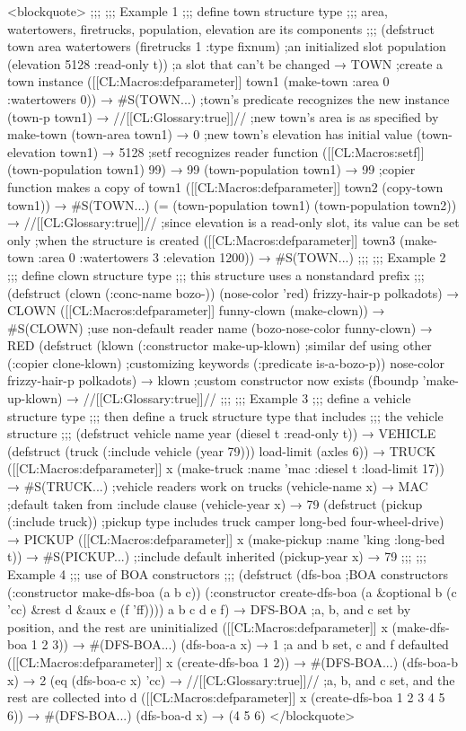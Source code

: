<blockquote> ;;; ;;; Example 1 ;;; define town structure type ;;; area, watertowers, firetrucks, population, elevation are its components ;;; (defstruct town area watertowers (firetrucks 1 :type fixnum) ;an initialized slot population (elevation 5128 :read-only t)) ;a slot that can't be changed → TOWN ;create a town instance ([[CL:Macros:defparameter]] town1 (make-town :area 0 :watertowers 0)) → #S(TOWN...) ;town's predicate recognizes the new instance (town-p town1) → //[[CL:Glossary:true]]// ;new town's area is as specified by make-town (town-area town1) → 0 ;new town's elevation has initial value (town-elevation town1) → 5128 ;setf recognizes reader function ([[CL:Macros:setf]] (town-population town1) 99) → 99 (town-population town1) → 99 ;copier function makes a copy of town1 ([[CL:Macros:defparameter]] town2 (copy-town town1)) → #S(TOWN...) (= (town-population town1) (town-population town2)) → //[[CL:Glossary:true]]// ;since elevation is a read-only slot, its value can be set only ;when the structure is created ([[CL:Macros:defparameter]] town3 (make-town :area 0 :watertowers 3 :elevation 1200)) → #S(TOWN...) ;;; ;;; Example 2 ;;; define clown structure type ;;; this structure uses a nonstandard prefix ;;; (defstruct (clown (:conc-name bozo-)) (nose-color 'red) frizzy-hair-p polkadots) → CLOWN ([[CL:Macros:defparameter]] funny-clown (make-clown)) → #S(CLOWN) ;use non-default reader name (bozo-nose-color funny-clown) → RED (defstruct (klown (:constructor make-up-klown) ;similar def using other (:copier clone-klown) ;customizing keywords (:predicate is-a-bozo-p)) nose-color frizzy-hair-p polkadots) → klown ;custom constructor now exists (fboundp 'make-up-klown) → //[[CL:Glossary:true]]// ;;; ;;; Example 3 ;;; define a vehicle structure type ;;; then define a truck structure type that includes ;;; the vehicle structure ;;; (defstruct vehicle name year (diesel t :read-only t)) → VEHICLE (defstruct (truck (:include vehicle (year 79))) load-limit (axles 6)) → TRUCK ([[CL:Macros:defparameter]] x (make-truck :name 'mac :diesel t :load-limit 17)) → #S(TRUCK...) ;vehicle readers work on trucks (vehicle-name x) → MAC ;default taken from :include clause (vehicle-year x) → 79 (defstruct (pickup (:include truck)) ;pickup type includes truck camper long-bed four-wheel-drive) → PICKUP ([[CL:Macros:defparameter]] x (make-pickup :name 'king :long-bed t)) → #S(PICKUP...) ;:include default inherited (pickup-year x) → 79 ;;; ;;; Example 4 ;;; use of BOA constructors ;;; (defstruct (dfs-boa ;BOA constructors (:constructor make-dfs-boa (a b c)) (:constructor create-dfs-boa (a &optional b (c 'cc) &rest d &aux e (f 'ff)))) a b c d e f) → DFS-BOA ;a, b, and c set by position, and the rest are uninitialized ([[CL:Macros:defparameter]] x (make-dfs-boa 1 2 3)) → #(DFS-BOA...) (dfs-boa-a x) → 1 ;a and b set, c and f defaulted ([[CL:Macros:defparameter]] x (create-dfs-boa 1 2)) → #(DFS-BOA...) (dfs-boa-b x) → 2 (eq (dfs-boa-c x) 'cc) → //[[CL:Glossary:true]]// ;a, b, and c set, and the rest are collected into d ([[CL:Macros:defparameter]] x (create-dfs-boa 1 2 3 4 5 6)) → #(DFS-BOA...) (dfs-boa-d x) → (4 5 6) </blockquote>

